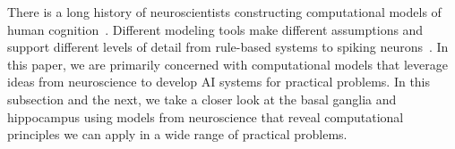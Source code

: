 

There is a long history of neuroscientists constructing computational models of human cognition~\cite{McClelland79,McClellandandRumelhartPR-88,LebiereandAndersonCSS-93,OReillySCIENCE-06,BotvinickPTRS_B-07}. Different modeling tools make different assumptions and support different levels of detail from rule-based systems to spiking neurons~\cite{OReillyetalLEABRA-16,OReillyetalCCN-12,RasmussenetalPLoS-ONE-17,Eliasmith2013,BlouwandEliasmithCSS-13,JilketalJETAI-08}. In this paper, we are primarily concerned with computational models that leverage ideas from neuroscience to develop AI systems for practical problems. In this subsection and the next, we take a closer look at the basal ganglia and hippocampus using models from neuroscience that reveal computational principles we can apply in a wide range of practical problems.



